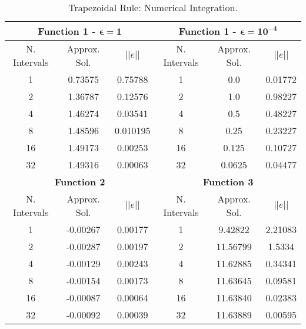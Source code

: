 \begin{table}[H]
    \centering
    \caption{Trapezoidal Rule: Numerical Integration.}
    \label{tab:trapezoidal_int}
    \begin{tabular}{ccc|ccc}
    \hline
    \multicolumn{3}{c}{\textbf{Function 1  -} $\bm{\epsilon = 1}$} & \multicolumn{3}{c}{\textbf{Function 1 -} $\bm{\epsilon = 10^{-4}}$} \\ \hline
    N. Intervals & Approx. Sol. & $|| e ||$ & N. Intervals & Approx. Sol. & $|| e ||$ \\ \hline
    1 & 0.73575 & 0.75788 & 1 & 0.0 & 0.01772 \\
    2 & 1.36787 & 0.12576 & 2 & 1.0 & 0.98227 \\
    4 & 1.46274 & 0.03541 & 4 & 0.5 & 0.48227 \\
    8 & 1.48596 & 0.010195 & 8 & 0.25 & 0.23227 \\
    16 & 1.49173 & 0.00253 & 16 & 0.125 & 0.10727 \\
    32 & 1.49316 & 0.00063 & 32 & 0.0625 & 0.04477 \\ \hline
    \multicolumn{3}{c}{\textbf{Function 2}} & \multicolumn{3}{c}{\bf{Function 3}} \\ \hline
    N. Intervals & Approx. Sol. & $|| e ||$ & N. Intervals & Approx. Sol. & $|| e ||$ \\ \hline
    1 &  {-0.00267} &  {0.00177} & 1 &  {9.42822} &  {2.21083} \\
    2 &  {-0.00287} &  {0.00197} & 2 &  {11.56799} &  {1.5334} \\
    4 &  {-0.00129} &  {0.00243} & 4 &  {11.62885} &  {0.34341} \\
    8 &  {-0.00154} &  {0.00173} & 8 &  {11.63645} &  {0.09581} \\
    16 &  {-0.00087} &  {0.00064} & 16 &  {11.63840} &  {0.02383} \\
    32 &  {-0.00092} &  {0.00039} & 32 &  {11.63889} &  {0.00595} \\ \hline
    \end{tabular}
\end{table}
